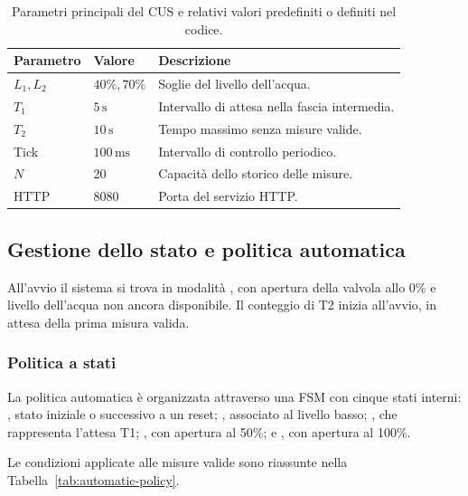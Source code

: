 \begin{table}[htbp]
\centering
\begin{tabularx}{\linewidth}{@{}l l X@{}}
\toprule
\textbf{Parametro} & \textbf{Valore} & \textbf{Descrizione} \\
\midrule
\(L_1,L_2\) & \(40\%,70\%\) & Soglie del livello dell'acqua. \\
\(T_1\) & \(5\,\mathrm{s}\) & Intervallo di attesa nella fascia intermedia. \\
\(T_2\) & \(10\,\mathrm{s}\) & Tempo massimo senza misure valide. \\
Tick & \(100\,\mathrm{ms}\) & Intervallo di controllo periodico. \\
\(N\) & 20 & Capacità dello storico delle misure. \\
HTTP & 8080 & Porta del servizio HTTP. \\
\bottomrule
\end{tabularx}
\caption{Parametri principali del CUS e relativi valori
predefiniti o definiti nel codice.}%
\label{tab:cus-parameters}
\end{table}
\FloatBarrier%


\subsection{Gestione dello stato e politica automatica}%
\label{subsec:cus-policy}
All'avvio il sistema si trova in modalità , con apertura della valvola allo \(0\%\) e livello dell'acqua non ancora disponibile.
Il conteggio di T2 inizia all'avvio, in attesa della prima misura valida.


\subsubsection{Politica a stati}
La politica automatica è organizzata attraverso una FSM con cinque stati interni: , stato  iniziale o successivo a un reset; , associato al livello basso; , che rappresenta l'attesa T1; , con apertura al 50\%; e , con apertura al 100\%.

Le condizioni applicate alle misure valide sono riassunte nella Tabella~\ref{tab:automatic-policy}.

